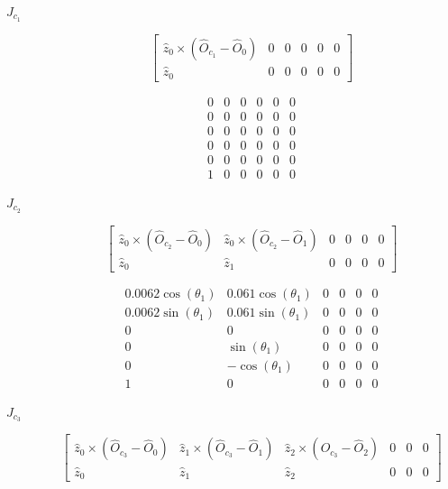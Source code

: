 \documentclass[journal]{new-aiaa}
\begin{document}
\begin{description}
    \item[$J_{c_1}$] \hfill
    $$
    \begin{bmatrix}
        \hat{z}_0 \times (\hat{O}_{c_1} - \hat{O}_0) & 0 & 0 & 0 & 0 & 0 \\
        \hat{z}_0                                    & 0 & 0 & 0 & 0 & 0
    \end{bmatrix}
    $$

    $$\begin{matrix}0 & 0 & 0 & 0 & 0 & 0\\0 & 0 & 0 & 0 & 0 & 0\\0 & 0 & 0 & 0 & 0 & 0\\0 & 0 & 0 & 0 & 0 & 0\\0 & 0 & 0 & 0 & 0 & 0\\1 & 0 & 0 & 0 & 0 & 0\end{matrix}$$

    \item[$J_{c_2}$] \hfill
    $$
    \begin{bmatrix}
        \hat{z}_0 \times (\hat{O}_{c_2} - \hat{O}_0) & \hat{z}_0 \times (\hat{O}_{c_2} - \hat{O}_1) & 0 & 0 & 0 & 0 \\
        \hat{z}_0                                    & \hat{z}_1                                    & 0 & 0 & 0 & 0
    \end{bmatrix}
    $$

    $$\begin{matrix}0.0062 \cos{\left(\theta_{1} \right)} & 0.061 \cos{\left(\theta_{1} \right)} & 0 & 0 & 0 & 0\\0.0062 \sin{\left(\theta_{1} \right)} & 0.061 \sin{\left(\theta_{1} \right)} & 0 & 0 & 0 & 0\\0 & 0 & 0 & 0 & 0 & 0\\0 & \sin{\left(\theta_{1} \right)} & 0 & 0 & 0 & 0\\0 & - \cos{\left(\theta_{1} \right)} & 0 & 0 & 0 & 0\\1 & 0 & 0 & 0 & 0 & 0\end{matrix}$$

    \item[$J_{c_3}$] \hfill
    $$
    \begin{bmatrix}
        \hat{z}_0 \times (\hat{O}_{c_3} - \hat{O}_0) & \hat{z}_1 \times (\hat{O}_{c_3} - \hat{O}_1) & \hat{z}_2 \times (\hat{O}_{c_3} - \hat{O}_2) & 0 & 0 & 0 \\
        \hat{z}_0                                    & \hat{z}_1                                    & \hat{z}_2 & 0 & 0 & 0
    \end{bmatrix}
    $$


\end{description}
\end{document}
